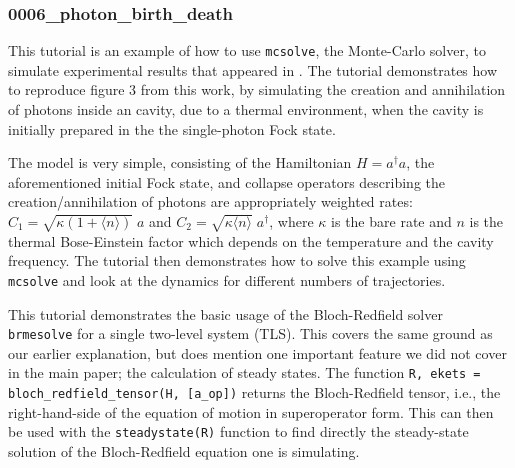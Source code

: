 \documentclass[preprint,3p,sort&compress]{elsarticle}
\def\code#1{\texttt{#1}}
\newcommand{\nocontentsline}[3]{}
\newcommand{\tocless}[2]{\bgroup\let\addcontentsline=\nocontentsline#1{#2}\egroup}
\begin{document}
\tocless\subsubsection{0006\_photon\_birth\_death}

This tutorial is an example of how to use \code{mcsolve}, the Monte-Carlo solver, to simulate experimental results that appeared in \cite{Gleyzes2007}. The tutorial demonstrates how to reproduce figure 3 from this work, by simulating the creation and annihilation of photons inside an cavity, due to a thermal environment, when the cavity is initially prepared in the the single-photon Fock state.  

The model is very simple, consisting of the Hamiltonian  $H = a^\dagger a$, the aforementioned initial Fock state, and collapse operators describing the creation/annihilation of photons are appropriately weighted rates: $C_1 = \sqrt{\kappa (1 + \langle n \rangle)} \; a$ and $C_2 = \sqrt{\kappa \langle n \rangle} \; a^\dagger$, where $\kappa$ is the bare rate and $n$ is the thermal Bose-Einstein factor which depends on the temperature and the cavity frequency.  The tutorial then demonstrates how to solve this example using \code{mcsolve} and look at the dynamics for different numbers of trajectories.\newline



\tocless\subsubsection{0007\_brmesolve\_tls}

This tutorial demonstrates the basic usage of the Bloch-Redfield solver \code{brmesolve} for a single two-level system (TLS). This covers the same ground as our earlier explanation, but does mention one important feature we did not cover in the main paper; the calculation of steady states.  The function \code{R, ekets = bloch\_redfield\_tensor(H, [a\_op])} returns the Bloch-Redfield tensor, i.e., the right-hand-side of the equation of motion in superoperator form. This can then be used with the \code{steadystate(R)} function to find directly the steady-state solution of the Bloch-Redfield equation one is simulating.\newline

\tocless\subsubsection{0008\_brmesolve\_time\_dependence}
\end{document}
